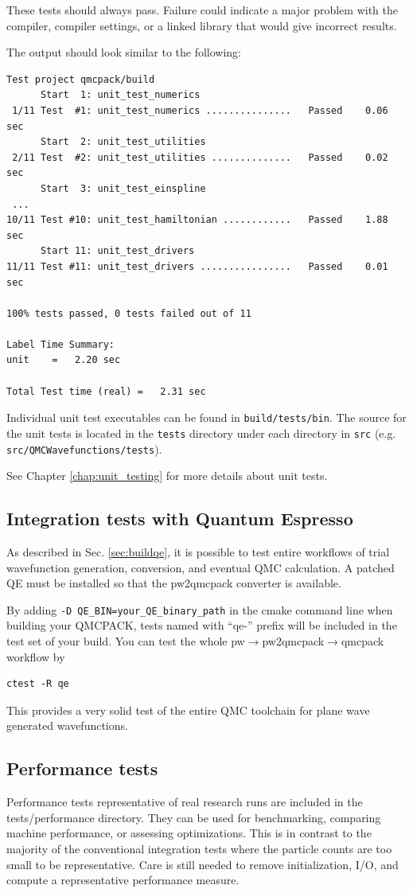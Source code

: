 These tests should always pass. Failure could indicate a major problem
with the compiler, compiler settings, or a linked library that would
give incorrect results.

The output should look similar to the following:
\verbatimfont{\footnotesize}
\begin{verbatim}
Test project qmcpack/build
      Start  1: unit_test_numerics
 1/11 Test  #1: unit_test_numerics ...............   Passed    0.06 sec
      Start  2: unit_test_utilities
 2/11 Test  #2: unit_test_utilities ..............   Passed    0.02 sec
      Start  3: unit_test_einspline
 ...
10/11 Test #10: unit_test_hamiltonian ............   Passed    1.88 sec
      Start 11: unit_test_drivers
11/11 Test #11: unit_test_drivers ................   Passed    0.01 sec

100% tests passed, 0 tests failed out of 11

Label Time Summary:
unit    =   2.20 sec

Total Test time (real) =   2.31 sec
\end{verbatim}

Individual unit test executables can be found in \texttt{build/tests/bin}.
The source for the unit tests is located in the \texttt{tests} directory under each directory in \texttt{src} (e.g. \texttt{src/QMCWavefunctions/tests}).

See Chapter \ref{chap:unit_testing} for more details about unit tests.

\subsection{Integration tests with Quantum Espresso}
\label{sec:integtestqe}
As described in Sec. \ref{sec:buildqe}, it is possible to test entire
workflows of trial wavefunction generation, conversion, and eventual
QMC calculation. A patched QE must be installed so that the
pw2qmcpack converter is available.

By adding \texttt{-D QE\_BIN=your\_QE\_binary\_path} in the cmake command line when building your QMCPACK,
tests named with ``qe-'' prefix will be included in the test set of your build.
You can test the whole pw$\to$pw2qmcpack$\to$qmcpack workflow by
\verbatimfont{\footnotesize}
\begin{verbatim}
ctest -R qe
\end{verbatim}
This provides a very solid test of the entire QMC
toolchain for plane wave generated wavefunctions.

\subsection{Performance tests}
\label{sec:perftests}
Performance tests representative of real research runs are included in the
tests/performance directory. They can be used for benchmarking, comparing machine
performance, or assessing optimizations. This is in
contrast to the majority of the conventional integration tests where the particle
counts are too small to be representative. Care is still needed to
remove initialization, I/O, and compute a representative performance
measure.

